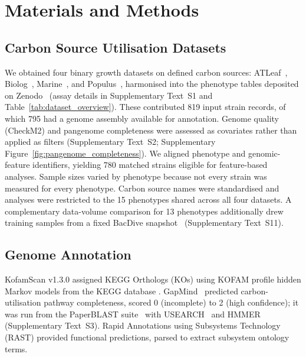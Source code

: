 
\section*{Materials and Methods}

\subsection*{Carbon Source Utilisation Datasets}

We obtained four binary growth datasets on defined carbon sources: ATLeaf~\cite{Schafer2023-nk}, Biolog~\cite{BiologDatasetCitation}, Marine~\cite{Gralka2023-ft}, and Populus~\cite{PopulusDatasetCitation}, harmonised into the phenotype tables deposited on Zenodo~\cite{ZenodoDeposit} (assay details in Supplementary Text~S1 and Table~\ref{tab:dataset_overview}).
These contributed 819 input strain records, of which 795 had a genome assembly available for annotation.
Genome quality (CheckM2) and pangenome completeness were assessed as covariates rather than applied as filters (Supplementary Text~S2; Supplementary Figure~\ref{fig:pangenome_completeness}).
We aligned phenotype and genomic-feature identifiers, yielding 780 matched strains eligible for feature-based analyses.
Sample sizes varied by phenotype because not every strain was measured for every phenotype.
Carbon source names were standardised and analyses were restricted to the 15 phenotypes shared across all four datasets.
A complementary data-volume comparison for 13 phenotypes additionally drew training samples from a fixed BacDive snapshot~\cite{Schober2025BacDive} (Supplementary Text~S11).

\subsection*{Genome Annotation}

KofamScan v1.3.0 \cite{Aramaki2020KofamKOALA} assigned KEGG Orthologs (KOs) using KOFAM profile hidden Markov models from the KEGG database \cite{Kanehisa2000KEGG}.
GapMind~\cite{Price2022GapMindCarbon,Price2020GapMind} predicted carbon-utilisation pathway completeness, scored 0 (incomplete) to 2 (high confidence); it was run from the PaperBLAST suite~\cite{Price2017PaperBLAST} with USEARCH~\cite{Edgar2010} and HMMER~\cite{Eddy2011} (Supplementary Text~S3).
Rapid Annotations using Subsystems Technology (RAST) \cite{Aziz2008RAST} provided functional predictions, parsed to extract subsystem ontology terms.

